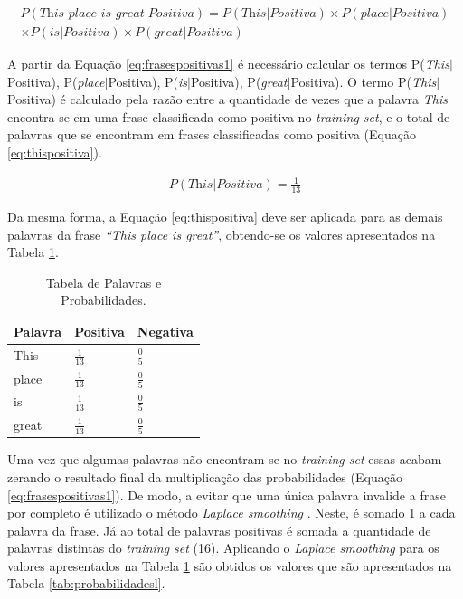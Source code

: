 \begin{equation}
\begin{gathered}
P(\textit{This place is great}|Positiva) = P(\textit{This}|Positiva)
\times P(\textit{place}|Positiva) \\ \times P(\textit{is}|Positiva) \times
P(\textit{great}|Positiva)
\label{eq:frasespositivas1}
\end{gathered}
\end{equation}

A partir da Equação \ref{eq:frasespositivas1} é necessário calcular os
termos P(\textit{This}$\vert$Positiva),
P(\textit{place}$\vert$Positiva), P(\textit{is}$\vert$Positiva), P(\textit{great}$\vert$Positiva).
O termo P(\textit{This}$\vert$Positiva) é calculado pela razão entre a
quantidade de vezes que a palavra \textit{This} encontra-se em uma frase
classificada como positiva no \textit{training set}, e o total de palavras que
se encontram em frases classificadas como positiva (Equação
\ref{eq:thispositiva}).

\begin{equation}
\begin{gathered}
P(\textit{This}|Positiva) = \frac{1}{13}
\label{eq:thispositiva}
\end{gathered}
\end{equation}


Da mesma forma, a Equação \ref{eq:thispositiva} deve ser aplicada para as demais
palavras da frase \textit{``This place is great''}, obtendo-se os valores
apresentados na Tabela \ref{tab:probabilidadesnb}.

\begin{table}[htb]
\centering
\renewcommand{\arraystretch}{1.5}%
\begin{tabular}{lll}
\hline

Palavra & Positiva & Negativa \\ \hline
This & \large $\frac{1}{13}$ & \large $\frac{0}{5}$ \\
place & \large $\frac{1}{13}$ & \large $\frac{0}{5}$ \\
is & \large $\frac{1}{13}$ & \large $\frac{0}{5}$ \\
great & \large $\frac{1}{13}$ & \large $\frac{0}{5}$ \\
\end{tabular}
\caption{Tabela de Palavras e Probabilidades.}
\label{tab:probabilidadesnb}
\end{table}

Uma vez que algumas palavras não encontram-se no \textit{training set}
essas acabam zerando o resultado final da
multiplicação das probabilidades (Equação
\ref{eq:frasespositivas1}). De modo, a evitar que uma única palavra
invalide a frase por completo é utilizado o método \textit{Laplace smoothing}
\cite{Manning:2008:IIR:1394399}. Neste, é somado 1 a cada palavra da frase. Já
ao total de palavras positivas é somada a quantidade de palavras distintas do
\textit{training set} (16). Aplicando o \textit{Laplace smoothing} para os
valores apresentados na Tabela \ref{tab:probabilidadesnb} são obtidos os valores
que são apresentados na Tabela \ref{tab:probabilidadesl}.


